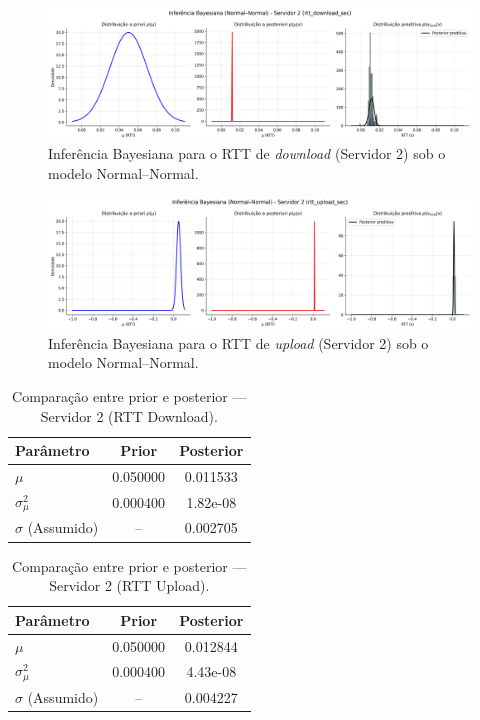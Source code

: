 \documentclass{article}
\begin{document}
\begin{figure}[htp!]
	\centering
	\includegraphics[width=\textwidth]{../figures/bayes/rtt_download_sec_bayesian_normalnormal_server02.png}
	\caption{Inferência Bayesiana para o RTT de \textit{download} (Servidor 2) sob o modelo Normal–Normal.}
	\label{fig:rtt_download_sec_bayesian_normalnormal_server02}
\end{figure}
\begin{figure}[htp!]
	\centering
	\includegraphics[width=\textwidth]{../figures/bayes/rtt_upload_sec_bayesian_normalnormal_server02.png}
	\caption{Inferência Bayesiana para o RTT de \textit{upload} (Servidor 2) sob o modelo Normal–Normal.}
	\label{fig:rtt_upload_sec_bayesian_normalnormal_server02}
\end{figure}

\begin{table}[H]
	\centering
	\caption{Comparação entre prior e posterior — Servidor 2 (RTT Download).}
	\label{tab:bayes_rtt_download_server02}
	\begin{tabular}{lcc}
		\hline
		\textbf{Parâmetro} & \textbf{Prior} & \textbf{Posterior} \\ \hline
		$\mu$ & 0.050000 & 0.011533 \\
		$\sigma^2_{\mu}$ & 0.000400 & 1.82e-08 \\
		$\sigma$ (Assumido) & -- & 0.002705 \\ \hline
	\end{tabular}
\end{table}

\begin{table}[H]
	\centering
	\caption{Comparação entre prior e posterior — Servidor 2 (RTT Upload).}
	\label{tab:bayes_rtt_upload_server02}
	\begin{tabular}{lcc}
		\hline
		\textbf{Parâmetro} & \textbf{Prior} & \textbf{Posterior} \\ \hline
		$\mu$ & 0.050000 & 0.012844 \\
		$\sigma^2_{\mu}$ & 0.000400 & 4.43e-08 \\
		$\sigma$ (Assumido) & -- & 0.004227 \\ \hline
	\end{tabular}
\end{table}
\end{document}
